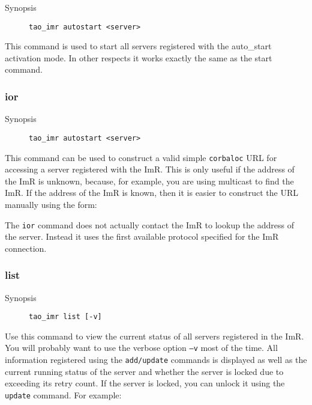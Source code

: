\begin{description}
    \item [Synopsis] {\tt tao\_imr autostart <server>}
\end{description}

This command is used to start all servers registered with the auto_start
activation mode. In other respects it works exactly the same as the
start command.

\subsubsection{ior}

\begin{description}
    \item [Synopsis] {\tt tao\_imr autostart <server>}
\end{description}

This command can be used to construct a valid simple {\tt corbaloc} URL
for accessing a server registered with the ImR. This is only useful if the
address of the ImR is unknown, because, for example, you are using multicast
to find the ImR.  If the address of the ImR is known, then it is easier to construct
the URL manually using the form:


The {\tt ior} command does not actually contact the ImR to lookup the address
of the server. Instead it uses the first available protocol specified for the
ImR connection.

\subsubsection{list}

\begin{description}
    \item [Synopsis] {\tt tao\_imr list [-v]}
\end{description}

Use this command to view the current status of all servers registered
in the ImR. You will probably want to use the verbose option {\tt–v}
 most of the time. All information registered using the {\tt add/update}
commands is displayed as well as the current running status of the
server and whether the server is locked due to exceeding its retry count.
If the server is locked, you can unlock it using the {\tt update} command.
For example:


